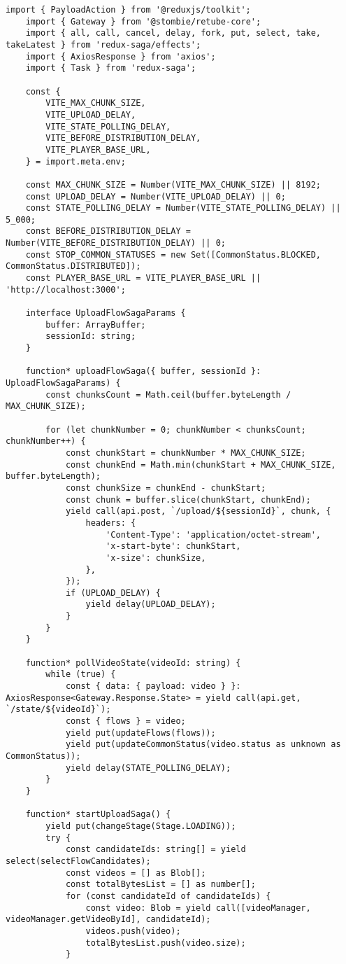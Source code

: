 \begin{lstlisting}[caption={shared/sagas.ts}]
	import { PayloadAction } from '@reduxjs/toolkit';
	import { Gateway } from '@stombie/retube-core';
	import { all, call, cancel, delay, fork, put, select, take, takeLatest } from 'redux-saga/effects';
	import { AxiosResponse } from 'axios';
	import { Task } from 'redux-saga';
	
	const {
		VITE_MAX_CHUNK_SIZE,
		VITE_UPLOAD_DELAY,
		VITE_STATE_POLLING_DELAY,
		VITE_BEFORE_DISTRIBUTION_DELAY,
		VITE_PLAYER_BASE_URL,
	} = import.meta.env;
	
	const MAX_CHUNK_SIZE = Number(VITE_MAX_CHUNK_SIZE) || 8192;
	const UPLOAD_DELAY = Number(VITE_UPLOAD_DELAY) || 0;
	const STATE_POLLING_DELAY = Number(VITE_STATE_POLLING_DELAY) || 5_000;
	const BEFORE_DISTRIBUTION_DELAY = Number(VITE_BEFORE_DISTRIBUTION_DELAY) || 0;
	const STOP_COMMON_STATUSES = new Set([CommonStatus.BLOCKED, CommonStatus.DISTRIBUTED]);
	const PLAYER_BASE_URL = VITE_PLAYER_BASE_URL || 'http://localhost:3000';
	
	interface UploadFlowSagaParams {
		buffer: ArrayBuffer;
		sessionId: string;
	}
	
	function* uploadFlowSaga({ buffer, sessionId }: UploadFlowSagaParams) {
		const chunksCount = Math.ceil(buffer.byteLength / MAX_CHUNK_SIZE);
		
		for (let chunkNumber = 0; chunkNumber < chunksCount; chunkNumber++) {
			const chunkStart = chunkNumber * MAX_CHUNK_SIZE;
			const chunkEnd = Math.min(chunkStart + MAX_CHUNK_SIZE, buffer.byteLength);
			const chunkSize = chunkEnd - chunkStart;
			const chunk = buffer.slice(chunkStart, chunkEnd);
			yield call(api.post, `/upload/${sessionId}`, chunk, {
				headers: {
					'Content-Type': 'application/octet-stream',
					'x-start-byte': chunkStart,
					'x-size': chunkSize,
				},
			});
			if (UPLOAD_DELAY) {
				yield delay(UPLOAD_DELAY);
			}
		}
	}
	
	function* pollVideoState(videoId: string) {
		while (true) {
			const { data: { payload: video } }: AxiosResponse<Gateway.Response.State> = yield call(api.get, `/state/${videoId}`);
			const { flows } = video;
			yield put(updateFlows(flows));
			yield put(updateCommonStatus(video.status as unknown as CommonStatus));
			yield delay(STATE_POLLING_DELAY);
		}
	}
	
	function* startUploadSaga() {
		yield put(changeStage(Stage.LOADING));
		try {
			const candidateIds: string[] = yield select(selectFlowCandidates);
			const videos = [] as Blob[];
			const totalBytesList = [] as number[];
			for (const candidateId of candidateIds) {
				const video: Blob = yield call([videoManager, videoManager.getVideoById], candidateId);
				videos.push(video);
				totalBytesList.push(video.size);
			}
			

\end{lstlisting}
